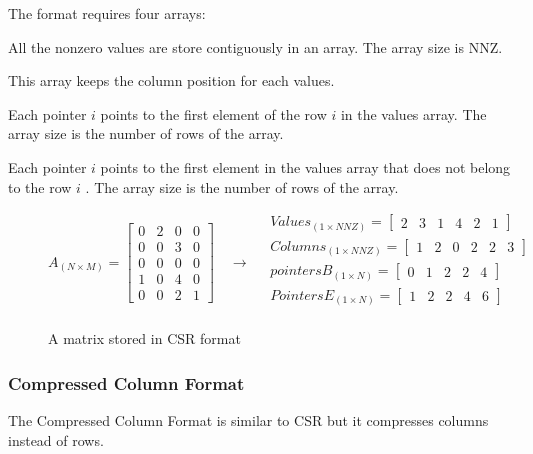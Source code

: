 The format requires four arrays:
\begin{description}[leftmargin=!,labelwidth=\widthof{\bfseries Beginning of row pointers}]
	\item [Values] All the nonzero values are store contiguously in an array. The array size is {NNZ}.
	\item [Column pointers] This array keeps the column position for each values.
	\item [Beginning of row pointers] Each pointer $i$ points to the first element of the row $i$ in the values array. The array size is the number of rows of the array.
	\item [End of row pointers]  Each pointer $i$ points to the first element in the values array that does not belong to the row $i$ . The array size is the number of rows of the array.
\end{description}

\begin{figure}
	\[
	A_{(N\times M)} = 
	\begin{bmatrix}
	0 & 2 & 0 & 0\\
	0 & 0 & 3 & 0\\
	0 & 0 & 0 & 0\\
	1 & 0 & 4 & 0\\
	0 & 0 & 2 & 1
	\end{bmatrix}
	\quad\rightarrow\quad
	\begin{aligned}
	Values_{(1\times NNZ)} = 
	\begin{bmatrix}
	2 &  3 & 1 & 4 & 2 & 1
	\end{bmatrix}
	\\
	Columns_{(1\times NNZ)} = 
	\begin{bmatrix}
	1 &  2 & 0 & 2 & 2 & 3
	\end{bmatrix}
	\\
	pointersB_{(1\times N)} = 
	\begin{bmatrix}
	0 & 1 & 2 & 2 & 4 
	\end{bmatrix}
	\\
	PointersE_{(1\times N)} = 
	\begin{bmatrix}
	1 & 2 & 2 & 4 & 6
	\end{bmatrix}
	\\
	\end{aligned}
	\]
	\caption{A matrix stored in CSR format}
\end{figure}
\subsubsection{Compressed Column Format}
The Compressed Column Format is similar to {CSR} but it compresses columns instead of rows.

